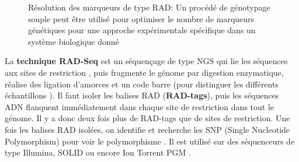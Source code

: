 \documentclass[a4paper]{article}
\begin{document}
\begin{figure}[!h]
\caption{Résolution des marqueurs de type RAD: Un procédé de génotypage souple peut être utilisé pour optimiser le nombre de marqueurs génétiques pour une approche expérimentale spécifique dans un système biologique donné\cite{peterson2012double}}
\end{figure}

La \textbf{technique RAD-Seq} est un séquençage de type NGS qui lie les séquences aux sites de restriction \cite{Baird:2008aa}, puis fragmente le génome par digestion enzymatique, réalise des ligation d'amorces et un code barre (pour distinguer les différents échantillons \cite{davey2013special}). Il faut isoler les balises RAD (\textbf{RAD-tags}), puis les séquences ADN flanquent immédiatement dans chaque site de restriction dans tout le génome. Il y a donc deux fois plus de RAD-tags que de sites de restriction\cite{davey2013special}. Une fois les balises RAD isolées, on identifie et recherche les SNP (Single Nucleotide Polymorphism) pour voir le polymorphisme \cite{hohenlohe2010population}. Il est utilisé sur des séquenceurs de type Illumina, SOLID ou encore Ion Torrent PGM \cite{hohenlohe2010population}. 
\end{document}
